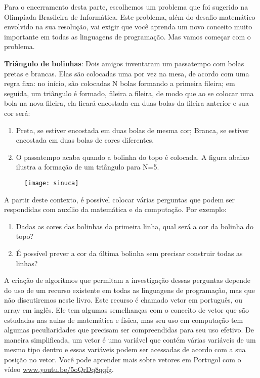\begin{project}
\label{comp-know3}

Para o encerramento desta parte, escolhemos um problema que foi sugerido na Olimpíada Brasileira de Informática. Este problema, além do desafio matemático envolvido na sua resolução, vai exigir que você aprenda um novo conceito muito importante em todas as linguagens de programação. Mas vamos começar com o problema.

\textbf{Triângulo de bolinhas}: Dois amigos inventaram um passatempo com bolas pretas e brancas. Elas são colocadas uma por vez na mesa, de acordo com uma regra fixa: no início, são colocadas N bolas formando a primeira fileira; em seguida, um triângulo é formado, fileira a fileira, de modo que ao se colocar uma bola na nova fileira, ela ficará encostada em duas bolas da fileira anterior e sua cor será:

\begin{enumerate}
\item Preta, se estiver encostada em duas bolas de mesma cor;
Branca, se estiver encostada em duas bolas de cores diferentes.

\item O passatempo acaba quando a bolinha do topo é colocada. A figura abaixo ilustra a formação de um triângulo para N=5.
\end{enumerate}

\begin{figure}[H]
\centering

\texttt{[image: sinuca]}
\end{figure}

A partir deste contexto, é possível colocar várias perguntas que podem ser respondidas com auxílio da matemática e da computação. Por exemplo:

\begin{enumerate}
\item Dadas as cores das bolinhas da primeira linha, qual será a cor da bolinha do topo?
\item É possível prever a cor da última bolinha sem precisar construir todas as linhas?
\end{enumerate}




A criação de algoritmos que permitam a investigação dessas perguntas depende do uso de um recurso existente em todas as linguagens de programação, mas que não discutiremos neste livro. Este recurso é chamado vetor em português, ou array em inglês. Ele tem algumas semelhanças com o conceito de vetor que são estudadas nas aulas de matemática e física, mas seu uso em computação tem algumas peculiaridades que precisam ser compreendidas para seu uso efetivo. De maneira simplificada, um vetor é uma variável que contém várias variáveis de um mesmo tipo dentro e essas variáveis podem ser acessadas de acordo com a sua posição no vetor. Você pode aprender mais sobre vetores em Portugol com o vídeo \url{www.youtu.be/5oQrDq8qqfg}.


\end{project}
